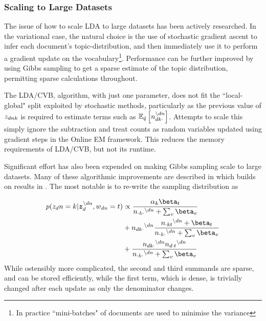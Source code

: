 

\subsubsection*{Scaling to Large Datasets}
The issue of how to scale LDA to large datasets has been actively researched. In the variational case, the natural choice is the use of stochastic gradient ascent\cite{Bottou2004}\cite{Bottou2008} to infer each document's topic-distribution, and then immediately use it to perform a gradient update on the vocabulary\cite{Hoffman2010}\footnote{In practice ``mini-batches" of documents are used to minimise the variance}. Performance can be further improved by using Gibbs sampling to get a sparse estimate of the topic distribution, permitting sparse calculations throughout\cite{Mimno2012a}.

The LDA/CVB, algorithm, with just one parameter, does not fit the ``local-global" split exploited by stochastic methods, particularly as the previous value of $\zdnk$ is required to estimate terms such as $\ex{n_{dk\cdot}^{\setminus dn}}{\hat{q}}$. Attempts to scale this\cite{Boyles2013} simply ignore the subtraction and treat counts as random variables updated using gradient steps in the Online EM framework\cite{Cappe2009}. This reduces the memory requirements of LDA/CVB, but not its runtime.

Significant effort has also been expended on making Gibbs sampling scale to large datasets. Many of these algorithmic improvements are described in \cite{Yao2009} which builds on results in \cite{Porteous2008}. The most notable is to re-write the sampling distribution as

\newcommand \nodn { { ^{\setminus dn } } }

\begin{align}
\begin{split}
p(z_dn = k | \vv{z}_{d}^{\setminus dn}, w_{dn}=t) & \propto \frac{\alpha_k \beta_t}{n_{\cdot k \cdot}\nodn + \sum_v \beta_v} \\
& + n_{dk\cdot}\nodn \frac{n_{\cdot kt}\nodn + \beta_t}{n_{\cdot k \cdot}\nodn + \sum_v \beta_v} \\
& + \frac{n_{dk\cdot}\nodn n_{d\cdot t}\nodn}{n_{\cdot k \cdot}\nodn + \sum_v \beta_v}
\end{split}
\end{align}
While ostensibly more complicated, the second and third summands are sparse, and can be stored efficiently, while the first term, which is dense, is trivially changed after each update as only the denominator changes.

